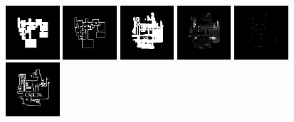\begin{figure}[h!] 
	\begin{minipage}[b]{\linewidth}
		\begin{center}
		\includegraphics[width=2cm]{figures/results/samples/cond/sample13_map_heightmap_true.png}
		\includegraphics[width=2cm]{figures/results/samples/cond/sample13_map_wallmap_true.png}
		\hfill 
		\includegraphics[width=2cm]{figures/results/samples/cond/sample13_map_floormap_generated.png}
		\includegraphics[width=2cm]{figures/results/samples/cond/sample13_map_heightmap_generated.png}
		\includegraphics[width=2cm]{figures/results/samples/cond/sample13_map_thingsmap_generated.png}
		\includegraphics[width=2cm]{figures/results/samples/cond/sample13_map_wallmap_generated.png}
	\end{center}


\end{minipage}
\end{figure}
